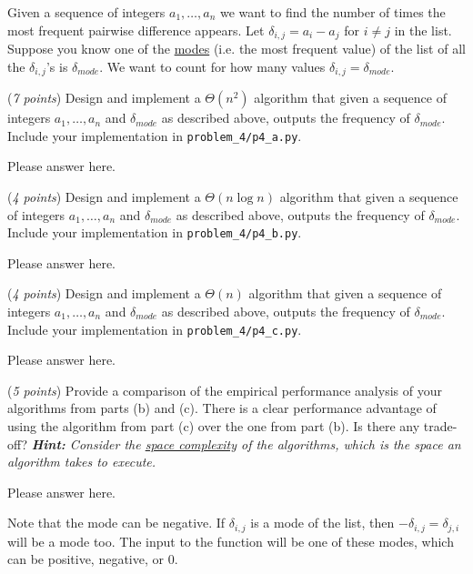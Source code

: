\documentclass{hw_template}
\begin{document}
\begin{problem}
  Given a sequence of integers $a_1,\ldots,a_n$ we want to find the
  number of times the most frequent pairwise difference appears.
  Let $\delta_{i, j} = a_i - a_j$ for $i \ne j$ in the list. Suppose you know one of the \href{https://en.wikipedia.org/wiki/Mode_(statistics)}{modes} (i.e. the most frequent value) of the list of all the $\delta_{i, j}$'s is $\delta_{mode}$. We want to count for how many values $\delta_{i, j} = \delta_{mode}$. 
\begin{subproblem}
    (\textit{7 points})
    Design and implement a $\Theta(n ^ 2)$ algorithm that given a sequence of integers $a_1,\ldots,a_n$ and $\delta_{mode}$ as described above, outputs the frequency of $\delta_{mode}$. Include your implementation in \texttt{problem\_4/p4\_a.py}.
  \end{subproblem}
    \begin{solution}
        Please answer here.
    \end{solution}

  \begin{subproblem}
    (\textit{4 points})
    Design and implement a $\Theta(n \log n)$ algorithm that given a sequence of integers $a_1,\ldots,a_n$ and $\delta_{mode}$ as described above, outputs the frequency of $\delta_{mode}$. Include your implementation in \texttt{problem\_4/p4\_b.py}.
  \end{subproblem}
    \begin{solution}
        Please answer here.
    \end{solution}

  \begin{subproblem}
    (\textit{4 points})
    Design and implement a $\Theta(n)$ algorithm that given a sequence of integers $a_1,\ldots,a_n$ and $\delta_{mode}$ as described above, outputs the frequency of $\delta_{mode}$. Include your implementation in \texttt{problem\_4/p4\_c.py}.
  \end{subproblem}
    \begin{solution}
        Please answer here.
    \end{solution}

  \begin{subproblem}
    (\textit{5 points})
    Provide a comparison of the empirical performance analysis of your algorithms from parts (b) and (c). There is a clear performance advantage of using the algorithm from part (c) over the one from part (b). Is there any trade-off? \textit{\textbf{Hint:} Consider the \href{https://en.wikipedia.org/wiki/Space_complexity}{space complexity} of the algorithms, which is the space an algorithm takes to execute.}
  \end{subproblem}
    \begin{solution}
        Please answer here.
    \end{solution}

  
  Note that the mode can be negative. If $\delta_{i, j}$ is a mode of the list,
  then $-\delta_{i, j} = \delta_{j, i}$ will be a mode too. The input to the
  function will be one of these modes, which can be positive, negative, or 0.
\end{problem}
\newpage
\end{document}

